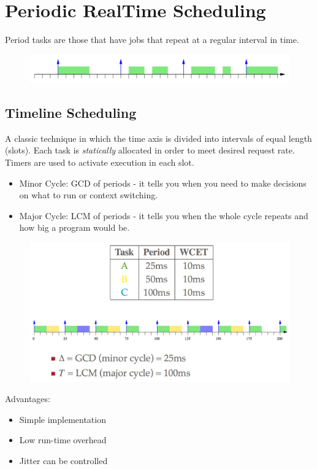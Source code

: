 \documentclass{hw}
\begin{document}
\section{Periodic Real\-Time Scheduling}
Period tasks are those that have jobs that repeat at a regular interval in time.
\begin{figure}[H]
  \centering
  \includegraphics[scale=.6]{img/period}
\end{figure}

\subsection{Timeline Scheduling}
A classic technique in which the time axis is divided into intervals of equal 
length (slots). Each task is \emph{statically} allocated in order to meet
desired request rate. Timers are used to activate execution in each slot.
\begin{itemize}
  \item Minor Cycle: GCD of periods - it tells you when you need to make 
    decisions on what to run or context switching.
  \item Major Cycle: LCM of periods - it tells you when the whole cycle repeats
    and how big a program would be.
\end{itemize}
\begin{figure}[H]
  \centering
  \includegraphics[scale=.6]{img/timeline}
\end{figure}
Advantages:
\begin{itemize}
  \item Simple implementation
  \item Low run-time overhead
  \item Jitter can be controlled
\end{itemize}
\end{document}
